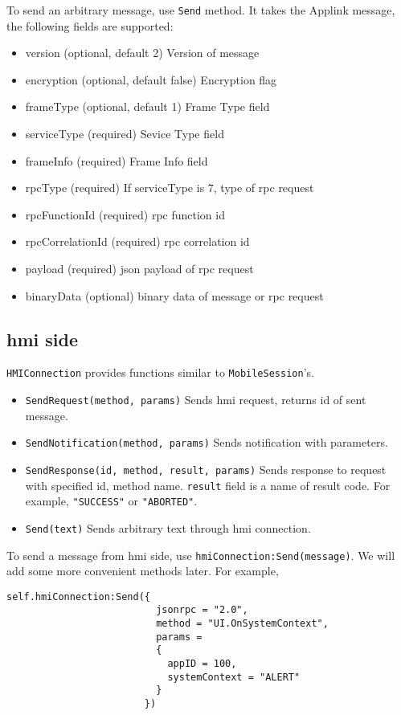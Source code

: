 \documentclass{article}
\begin{document}
To send an arbitrary message, use {\tt Send} method.
It takes the Applink message, the following fields are supported:
\begin{itemize}
\item version (optional, default 2) Version of message
\item encryption (optional, default false) Encryption flag
\item frameType (optional, default 1) Frame Type field
\item serviceType (required) Sevice Type field
\item frameInfo (required) Frame Info field
\item rpcType (required) If serviceType is 7, type of {\sc rpc} request
\item rpcFunctionId (required) {\sc rpc} function id
\item rpcCorrelationId (required) {\sc rpc} correlation id
\item payload (required) {\sc json} payload of {\sc rpc} request
\item binaryData (optional) binary data of message or {\sc rpc} request
\end{itemize}

\subsection{{\sc hmi} side}
{\tt HMIConnection} provides functions similar to {\tt MobileSession}'s.
\begin{itemize}
  \item {\tt SendRequest(method, params)} Sends {\sc hmi} request, returns id of sent message.
  \item {\tt SendNotification(method, params)} Sends notification with parameters.
  \item {\tt SendResponse(id, method, result, params)} Sends response to request with specified
  id, method name. {\tt result} field is a name of result code.
  For example, {\tt "SUCCESS"} or {\tt "ABORTED"}.
  \item {\tt Send(text)} Sends arbitrary text through {\sc hmi} connection.
\end{itemize}
To send a message from {\sc hmi} side, use {\tt hmiConnection:Send(message)}.
We will add some more convenient methods later.
For example,
\begin{lstlisting}
self.hmiConnection:Send({
                          jsonrpc = "2.0",
                          method = "UI.OnSystemContext",
                          params =
                          {
                            appID = 100,
                            systemContext = "ALERT"
                          }
                        })
\end{lstlisting}
\end{document}

